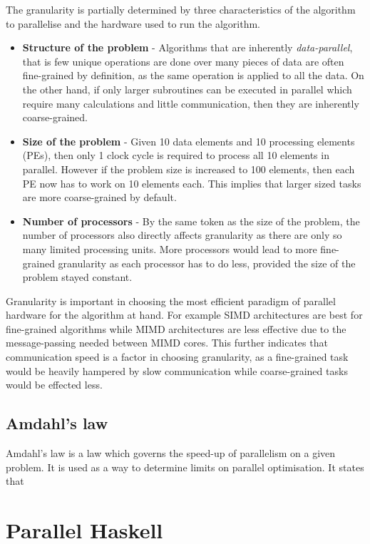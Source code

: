 \documentclass[CS4204-Notes.tex]{subfiles}
\begin{document}
\noindent
The granularity is partially determined by three characteristics of the algorithm to parallelise and the hardware used to run the algorithm.
\begin{itemize}
\item \textbf{Structure of the problem} - Algorithms that are inherently \textit{data-parallel}, that is few unique operations are done over many pieces of data are often fine-grained by definition, as the same operation is applied to all the data. On the other hand, if only larger subroutines can be executed in parallel which require many calculations and little communication, then they are inherently coarse-grained. 
\item \textbf{Size of the problem} - Given 10 data elements and 10 processing elements (PEs), then only 1 clock cycle is required to process all 10 elements in parallel. However if the problem size is increased to 100 elements, then each PE now has to work on 10 elements each. This implies that larger sized tasks are more coarse-grained by default.
\item \textbf{Number of processors} - By the same token as the size of the problem, the number of processors also directly affects granularity as there are only so many limited processing units. More processors would lead to more fine-grained granularity as each processor has to do less, provided the size of the problem stayed constant. 
\end{itemize}
Granularity is important in choosing the most efficient paradigm of parallel hardware for the algorithm at hand. For example SIMD architectures are best for fine-grained algorithms while MIMD architectures are less effective due to the message-passing needed between MIMD cores. This further indicates that communication speed is a factor in choosing granularity, as a fine-grained task would be heavily hampered by slow communication while coarse-grained tasks would be effected less. 

\subsection{Amdahl's law}
Amdahl's law is a law which governs the speed-up of parallelism on a given problem. It is used as a way to determine limits on parallel optimisation. It states that 

\section{Parallel Haskell}
\end{document}
